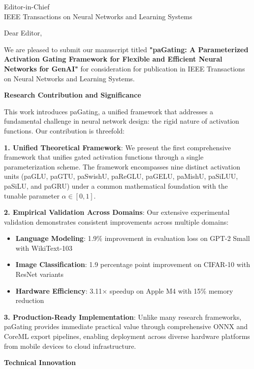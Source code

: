 \documentclass[11pt]{letter}
\begin{document}
\begin{letter}{Editor-in-Chief\\
IEEE Transactions on Neural Networks and Learning Systems}

\opening{Dear Editor,}

We are pleased to submit our manuscript titled \textbf{"paGating: A Parameterized Activation Gating Framework for Flexible and Efficient Neural Networks for GenAI"} for consideration for publication in IEEE Transactions on Neural Networks and Learning Systems.

\textbf{\large Research Contribution and Significance}

\vspace{0.5em}

This work introduces paGating, a unified framework that addresses a fundamental challenge in neural network design: the rigid nature of activation functions. Our contribution is threefold:

\textbf{1. Unified Theoretical Framework}: We present the first comprehensive framework that unifies gated activation functions through a single parameterization scheme. The framework encompasses nine distinct activation units (paGLU, paGTU, paSwishU, paReGLU, paGELU, paMishU, paSiLUU, paSiLU, and paGRU) under a common mathematical foundation with the tunable parameter $\alpha \in [0,1]$.

\textbf{2. Empirical Validation Across Domains}: Our extensive experimental validation demonstrates consistent improvements across multiple domains:
\begin{itemize}
    \item \textbf{Language Modeling}: 1.9\% improvement in evaluation loss on GPT-2 Small with WikiText-103
    \item \textbf{Image Classification}: 1.9 percentage point improvement on CIFAR-10 with ResNet variants
    \item \textbf{Hardware Efficiency}: 3.11× speedup on Apple M4 with 15\% memory reduction
\end{itemize}

\textbf{3. Production-Ready Implementation}: Unlike many research frameworks, paGating provides immediate practical value through comprehensive ONNX and CoreML export pipelines, enabling deployment across diverse hardware platforms from mobile devices to cloud infrastructure.

\textbf{\large Technical Innovation}

\vspace{0.5em}


\end{letter}
\end{document}

